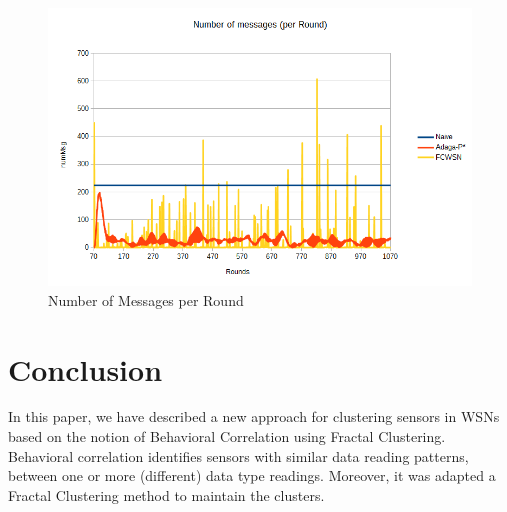 \documentclass{acm_proc_article-sp}
\begin{document}
\begin{figure}[!htb]
\begin{center}
	\includegraphics[scale=0.35]{FCWSN-NumMsgPerRoundxRound02-SD1.png}
    \caption{Number of Messages per Round}
    \label{fig:num-msg}
\end{center}
\end{figure}





\section{Conclusion}
\label{conclusion}

In this paper, we have described a new approach for clustering sensors in WSNs
based on the notion of Behavioral Correlation using Fractal Clustering.
Behavioral correlation identifies sensors with similar data reading patterns,
between one or more (different) data type readings. Moreover, it was adapted a
Fractal Clustering method to maintain the clusters.
\end{document}

